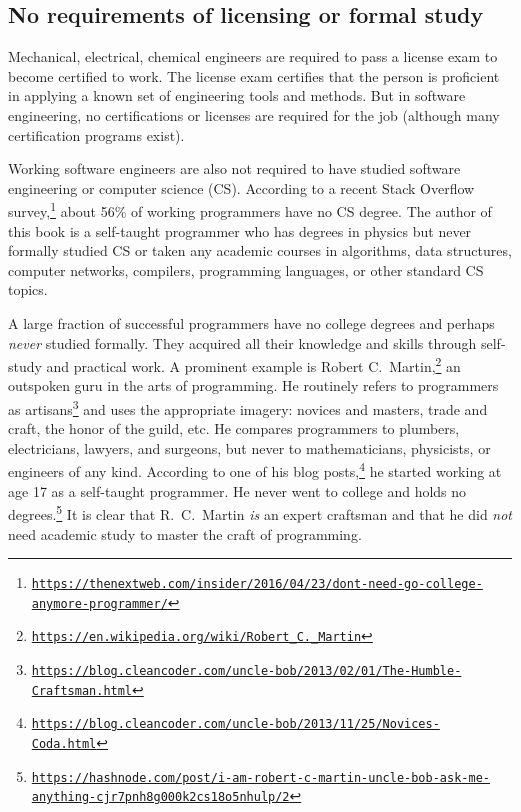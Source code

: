 \subsection{No requirements of licensing or formal study}

Mechanical, electrical, chemical engineers are required to pass a
license exam to become certified to work. The license exam certifies
that the person is proficient in applying a known set of engineering
tools and methods. But in software engineering, no certifications
or licenses are required for the job (although many certification
programs exist).

Working software engineers are also not required to have studied software
engineering or computer science (CS). According to a recent Stack
Overflow survey,\footnote{\texttt{\href{https://thenextweb.com/insider/2016/04/23/dont-need-go-college-anymore-programmer/}{https://thenextweb.com/insider/2016/04/23/dont-need-go-college-anymore-programmer/}}}
about 56\% of working programmers have no CS degree. The author of
this book is a self-taught programmer who has degrees in physics but
never formally studied CS or taken any academic courses in algorithms,
data structures, computer networks, compilers, programming languages,
or other standard CS topics. 

A large fraction of successful programmers have no college degrees
and perhaps \emph{never} studied formally. They acquired all their
knowledge and skills through self-study and practical work. A prominent
example is Robert C.~Martin,\footnote{\texttt{\href{https://en.wikipedia.org/wiki/Robert_C._Martin}{https://en.wikipedia.org/wiki/Robert\_C.\_Martin}}}
an outspoken guru in the arts of programming. He routinely refers
to programmers as artisans\footnote{\texttt{\href{https://blog.cleancoder.com/uncle-bob/2013/02/01/The-Humble-Craftsman.html}{https://blog.cleancoder.com/uncle-bob/2013/02/01/The-Humble-Craftsman.html}}}
and uses the appropriate imagery: novices and masters, trade and craft,
the honor of the guild, etc. He compares programmers to plumbers,
electricians, lawyers, and surgeons, but never to mathematicians,
physicists, or engineers of any kind. According to one of his blog
posts,\footnote{\texttt{\href{https://blog.cleancoder.com/uncle-bob/2013/11/25/Novices-Coda.html}{https://blog.cleancoder.com/uncle-bob/2013/11/25/Novices-Coda.html}}}
he started working at age 17 as a self-taught programmer. He never
went to college and holds no degrees.\footnote{\texttt{\href{https://hashnode.com/post/i-am-robert-c-martin-uncle-bob-ask-me-anything-cjr7pnh8g000k2cs18o5nhulp/2}{https://hashnode.com/post/i-am-robert-c-martin-uncle-bob-ask-me-anything-cjr7pnh8g000k2cs18o5nhulp/2}}}
It is clear that R.~C.~Martin \emph{is} an expert craftsman and
that he did \emph{not} need academic study to master the craft of
programming.

